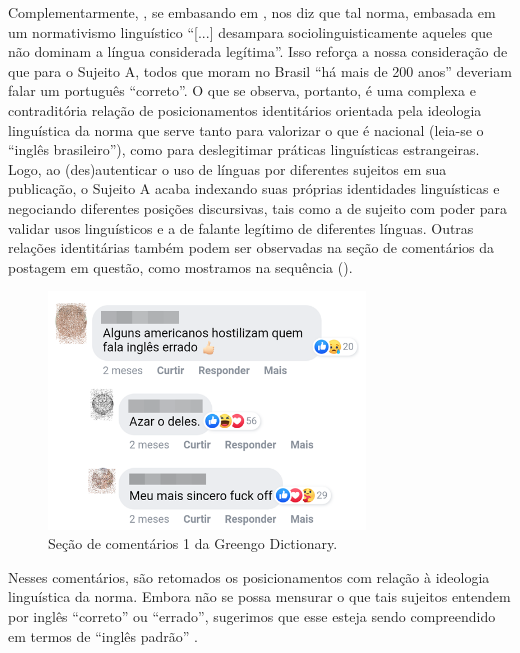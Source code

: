 \documentclass[portuguese]{textolivre}
\begin{document}
Complementarmente, \textcite[p. 23]{moita_lopes_ideologia_2013}, se embasando em \textcite[p. 501]{kroskrity_language_2004}, nos diz que tal norma, embasada em um normativismo linguístico “[...] desampara sociolinguisticamente aqueles que não dominam a língua considerada legítima”. Isso reforça a nossa consideração de que para o Sujeito A, todos que moram no Brasil “há mais de 200 anos” deveriam falar um português “correto”. O que se observa, portanto, é uma complexa e contraditória relação de posicionamentos identitários orientada pela ideologia linguística da norma que serve tanto para valorizar o que é nacional (leia-se o “inglês brasileiro”), como para deslegitimar práticas linguísticas estrangeiras. Logo, ao (des)autenticar o uso de línguas por diferentes sujeitos em sua publicação, o Sujeito A acaba indexando suas próprias identidades linguísticas e negociando diferentes posições discursivas, tais como a de sujeito com poder para validar usos linguísticos e a de falante legítimo de diferentes línguas.										
Outras relações identitárias também podem ser observadas na seção de comentários da postagem em questão, como mostramos na sequência ().

\begin{figure}[htbp]
 \centering
 \includegraphics[width=0.75\textwidth]{Fig2.png}
 \caption{Seção de comentários 1 da Greengo Dictionary.}
 \label{fig2}
\end{figure}

Nesses comentários, são retomados os posicionamentos com relação à ideologia linguística da norma. Embora não se possa mensurar o que tais sujeitos entendem por inglês “correto” ou “errado”, sugerimos que esse esteja sendo compreendido em termos de “inglês padrão” \cite{stubbs_lingua_2002}.
\end{document}
